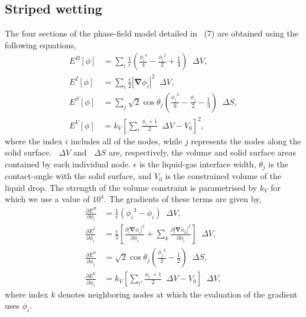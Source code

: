 \documentclass[aps,physrev,10pt]{revtex4-2}
\newcommand{\abs}[1]{\left| #1 \right|}
\newcommand{\grad}{\bm{\nabla}}
\newcommand{\upDelta}{\mathop{}\!\Delta}
\begin{document}
\subsection{Striped wetting}
The four sections of the phase-field model detailed in ~(7) are obtained using the following equations,
\begin{align}
  E^B[\phi] &= \sum_i \frac{1}{\epsilon} \left( \frac{{\phi_i}^4}{4} - \frac{{\phi_i}^2}{2} + \frac{1}{4} \right) \upDelta V,\\
  E^I[\phi] &= \sum_i \frac{\epsilon}{2} \abs{\grad \phi_i}^2 \upDelta V,\\
  E^S[\phi] &= \sum_j \sqrt{2}\cos\theta_j \left( \frac{{\phi_j}^3}{6} - \frac{\phi_j}{2} - \frac{1}{3} \right) \upDelta S,\\
  E^V[\phi] &= k_V \left[ \sum_i \frac{\phi_i + 1}{2} \upDelta V - V_0 \right]^2,
\end{align}
where the index $i$ includes all of the nodes, while $j$ represents the nodes along the solid surface.
$\upDelta V$ and $\upDelta S$ are, respectively, the volume and solid surface areas contained by each individual node.
$\epsilon$ is the liquid-gas interface width, $\theta_j$ is the contact-angle with the solid surface, and $V_0$ is the constrained volume of the liquid drop.
The strength of the volume constraint is parametrised by $k_V$ for which we use a value of $10^4$.
The gradients of these terms are given by,
\begin{align}
  \frac{\partial E^B}{\partial \phi_i} &= \frac{1}{\epsilon} \left( {\phi_i}^3 - \phi_i \right) \upDelta V,\\
  \frac{\partial E^I}{\partial \phi_i} &= \frac{\epsilon}{2} \left[
    \frac{\partial \abs{\grad \phi_i}^2}{\partial \phi_i} +
    \sum_k\frac{\partial \abs{\grad \phi_k}^2}{\partial \phi_i} \right] \upDelta V,\\
  \frac{\partial E^S}{\partial \phi_j} &= \sqrt{2}\cos\theta_j \left( \frac{{\phi_j}^2}{2} - \frac{1}{2} \right) \upDelta S,\\
  \frac{\partial E^V}{\partial \phi_i} &= k_V \left[ \sum_{i'} \frac{\phi_{i'} + 1}{2} \upDelta V - V_0 \right] \upDelta V,
\end{align}
where index $k$ denotes neighboring nodes at which the evaluation of the gradient uses $\phi_i$.
\end{document}

